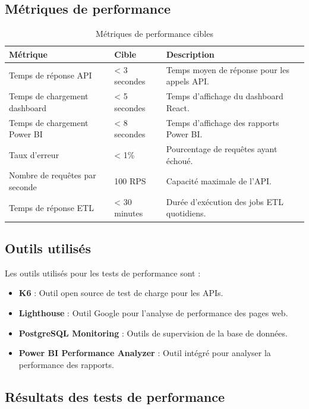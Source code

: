 \subsection{Métriques de performance}

\begin{table}[H]
\centering
\begin{tabular}{|p{4cm}|p{4cm}|p{5cm}|}
\hline
\textbf{Métrique} & \textbf{Cible} & \textbf{Description} \\
\hline
Temps de réponse API & < 3 secondes & Temps moyen de réponse pour les appels API. \\
\hline
Temps de chargement dashboard & < 5 secondes & Temps d'affichage du dashboard React. \\
\hline
Temps de chargement Power BI & < 8 secondes & Temps d'affichage des rapports Power BI. \\
\hline
Taux d'erreur & < 1\% & Pourcentage de requêtes ayant échoué. \\
\hline
Nombre de requêtes par seconde & 100 RPS & Capacité maximale de l'API. \\
\hline
Temps de réponse ETL & < 30 minutes & Durée d'exécution des jobs ETL quotidiens. \\
\hline
\end{tabular}
\caption{Métriques de performance cibles}
\label{tab:performance-targets}
\end{table}

\subsection{Outils utilisés}

Les outils utilisés pour les tests de performance sont :

\begin{itemize}
    \item \textbf{K6} : Outil open source de test de charge pour les APIs.
    \item \textbf{Lighthouse} : Outil Google pour l'analyse de performance des pages web.
    \item \textbf{PostgreSQL Monitoring} : Outils de supervision de la base de données.
    \item \textbf{Power BI Performance Analyzer} : Outil intégré pour analyser la performance des rapports.
\end{itemize}

\subsection{Résultats des tests de performance}

